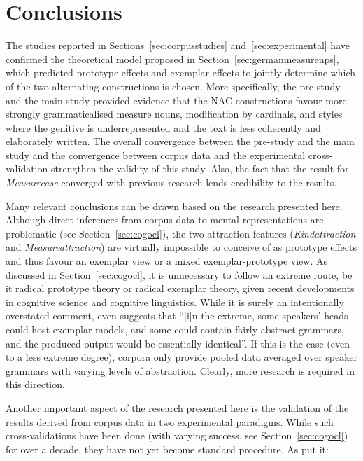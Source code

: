 \section{Conclusions}
\label{sec:conclusion}

The studies reported in Sections~\ref{sec:corpusstudies} and~\ref{sec:experimental} have confirmed the theoretical model proposed in Section~\ref{sec:germanmeasurenps}, which predicted prototype effects and exemplar effects to jointly determine which of the two alternating constructions is chosen.
More specifically, the pre-study and the main study provided evidence that the NAC constructions favour more strongly grammaticalised measure nouns, modification by cardinals, and styles where the genitive is underrepresented and the text is less coherently and elaborately written.
The overall convergence between the pre-study and the main study and the convergence between corpus data and the experimental cross-validation strengthen the validity of this study.
Also, the fact that the result for \textit{Measurecase} converged with previous research \citep{Zimmer2015} lends credibility to the results.

Many relevant conclusions can be drawn based on the research presented here.
Although direct inferences from corpus data to mental representations are problematic (see Section~\ref{sec:cogocl}), the two attraction features (\textit{Kindattraction} and \textit{Measureattraction}) are virtually impossible to conceive of as prototype effects and thus favour an exemplar view or a mixed exemplar-prototype view.
As discussed in Section~\ref{sec:cogocl}, it is unnecessary to follow an extreme route, be it radical prototype theory or radical exemplar theory, given recent developments in cognitive science and cognitive linguistics.
While it is surely an intentionally overstated comment, \citet[15]{Kapatsinski2014} even suggests that ``[i]n the extreme, some speakers’ heads could host exemplar models, and some could contain fairly abstract grammars, and the produced output would be essentially identical''.
If this is the case (even to a less extreme degree), corpora only provide pooled data averaged over speaker grammars with varying levels of abstraction.
Clearly, more research is required in this direction.

Another important aspect of the research presented here is the validation of the results derived from corpus data in two experimental paradigms.
While such cross-validations have been done (with varying success, see Section~\ref{sec:cogocl}) for over a decade, they have not yet become standard procedure.
As \citet[3--4]{DivjakEa2016a} put it:

